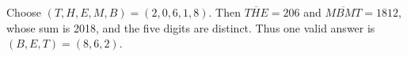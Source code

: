 Choose $(T,H,E,M,B)=(2,0,6,1,8)$. Then $\overline{THE}=206 $ and $\overline{MBMT}=1812 $, whose sum is 2018, and the five digits are distinct. Thus one valid answer is $\boxed{(B,E,T)=(8,6,2)}$.
